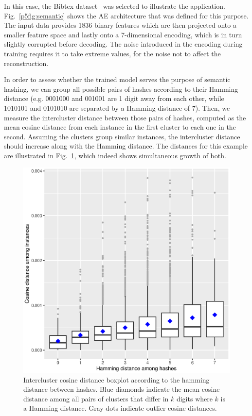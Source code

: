 In this case, the Bibtex dataset~\cite{bibtex} was selected to illustrate the application. Fig.~\ref{p5fig:semantic} shows the AE architecture that was defined for this purpose. The input data provides 1836 binary features which are then projected onto a smaller feature space and lastly onto a 7-dimensional encoding, which is in turn slightly corrupted before decoding. The noise introduced in the encoding during training requires it to take extreme values, for the noise not to affect the reconstruction.

In order to assess whether the trained model serves the purpose of semantic hashing, we can group all possible pairs of hashes according to their Hamming distance (e.g. 0001000 and 001001 are 1 digit away from each other, while 1010101 and 0101010 are separated by a Hamming distance of 7). Then, we measure the intercluster distance between those pairs of hashes, computed as the mean cosine distance from each instance in the first cluster to each one in the second. Assuming the clusters group similar instances, the intercluster distance should increase along with the Hamming distance. The distances for this example are illustrated in Fig.~\ref{p5fig:hashingplot}, which indeed shows simultaneous growth of both.

\begin{figure}[ht!]
    \centering
    \includegraphics[width=\linewidth]{hashing_intercluster.eps}
    \caption{\label{p5fig:hashingplot}Intercluster cosine distance boxplot according to the hamming distance between hashes. Blue diamonds indicate the mean cosine distance among all pairs of clusters that differ in $k$ digits where $k$ is a Hamming distance. Gray dots indicate outlier cosine distances.}
\end{figure}

